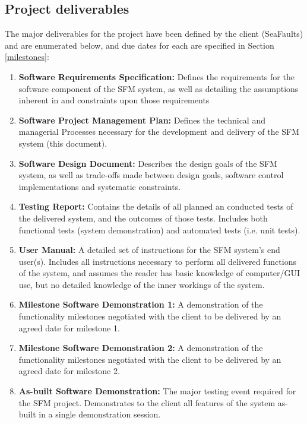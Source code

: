 \documentclass[12pt]{article}
\begin{document}
\subsection{Project deliverables}\label{deliverables}
The major deliverables for the project have been defined by the client (SeaFaults) and are enumerated below, and due dates for each are specified in Section \ref{milestones}:
\begin{enumerate}{}
\item{\textbf{Software Requirements Specification:}} Defines the requirements for the software component of the SFM system, as well as detailing the assumptions inherent in and constraints upon those requirements

\item{\textbf{Software Project Management Plan:}} Defines the technical and managerial Processes necessary for the development and delivery of the SFM system (this document).

\item{\textbf{Software Design Document:}} Describes the design goals of the SFM system, as well as trade-offs made between design goals, software control implementations and systematic constraints.

\item{\textbf{Testing Report:}} Contains the details of all planned an conducted tests of the delivered system, and the outcomes of those tests. Includes both functional tests (system demonstration) and automated tests (i.e. unit tests).

\item{\textbf{User Manual:}} A detailed set of instructions for the SFM system's end user(s). Includes all instructions necessary to perform all delivered functions of the system, and assumes the reader has basic knowledge of computer/GUI use, but no detailed knowledge of the inner workings of the system.

\item{\textbf{Milestone Software Demonstration 1:}} A demonstration of the functionality milestones negotiated with the client to be delivered by an agreed date for milestone 1.

\item{\textbf{Milestone Software Demonstration 2:}} A demonstration of the functionality milestones negotiated with the client to be delivered by an agreed date for milestone 2.

\item\textbf{{As-built Software Demonstration:}} The major testing event required for the SFM project. Demonstrates to the client all features of the system as-built in a single demonstration session.

\end{enumerate}
\end{document}
